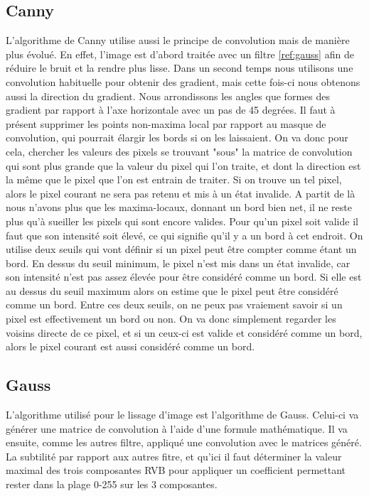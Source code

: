 \documentclass[twoside,openright,a4paper,11pt,french]{article}
\begin{document}
\subsection{Canny}
L'algorithme de Canny utilise aussi le principe de convolution mais de manière plus évolué.
En effet, l'image est d'abord traitée avec un filtre \ref{ref:gauss} afin de réduire le bruit et
la rendre plus lisse.
Dans un second temps nous utilisons une convolution habituelle pour obtenir des gradient, mais cette fois-ci
nous obtenons aussi la direction du gradient. Nous arrondissons les angles que formes des gradient par rapport
à l'axe horizontale avec un pas de 45 degrées.
Il faut à présent supprimer les points non-maxima local par rapport au masque de convolution, qui pourrait
élargir les bords si on les laissaient. On va donc pour cela, chercher les valeurs des pixels se trouvant "sous"
la matrice de convolution qui sont plus grande que la valeur du pixel qui l'on traite, et dont la direction est
la même que le pixel que l'on est entrain de traiter. Si on trouve un tel pixel, alors le pixel courant ne 
sera pas retenu et mis à un état invalide.
A partit de là nous n'avons plus que les maxima-locaux, donnant un bord bien net, il ne reste plus
qu'à sueiller les pixels qui sont encore valides. Pour qu'un pixel soit valide il faut que son intensité soit
élevé, ce qui signifie qu'il y a un bord à cet endroit. On utilise deux seuils qui vont définir si un pixel
peut être compter comme étant un bord. En dessus du seuil minimum, le pixel n'est mis dans un état invalide,
car son intensité n'est pas assez élevée pour être considéré comme un bord. Si elle est au dessus du seuil
maximum alors on estime que le pixel peut être considéré comme un bord. Entre ces deux seuils, on ne peux pas
vraiement savoir si un pixel est effectivement un bord ou non. On va donc simplement regarder les voisins directe
de ce pixel, et si un ceux-ci est valide et considéré comme un bord, alors le pixel courant est aussi considéré
comme un bord.

\subsection{Gauss}
\label{sec:gauss}
L'algorithme utilisé pour le lissage d'image est l'algorithme de Gauss. Celui-ci va générer une
matrice de convolution à l'aide d'une formule mathématique. Il va ensuite, comme les autres filtre,
appliqué une convolution avec le matrices généré. La subtilité par rapport aux autres fitre, et qu'ici
il faut déterminer la valeur maximal des trois composantes RVB pour appliquer un coefficient
permettant rester dans la plage 0-255 sur les 3 composantes.
\end{document}
